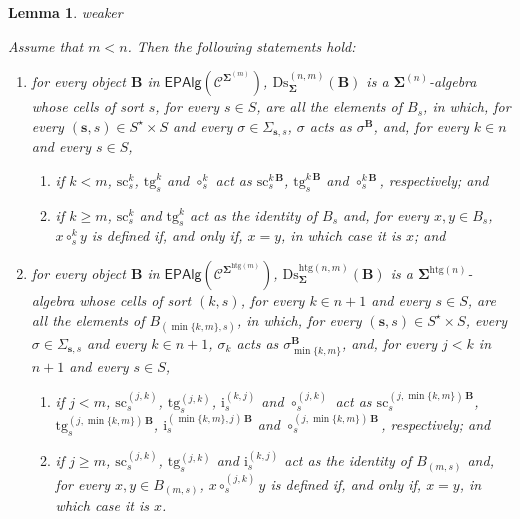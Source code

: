\documentclass[a4paper, reqno]{amsbook}
\makeatletter
\newcommand{\sig}[1]{\mathbf{#1}}             %
\newcommand{\spec}[1]{\boldsymbol{\mathcal{#1}}} %
\newcommand{\htg}{\mathrm{htg}}                %
\newcommand{\src}{\mathrm{sc}}
\newcommand{\tgt}{\mathrm{tg}}
\newcommand{\Ds}{\mathrm{Ds}}
\theoremstyle{plain}
\newtheorem{lemma}[theorem]{Lemma}
\theoremstyle{definition}
\newcommand*{\CA@leanpending}{}
\newcommand*{\CA@leanrelation}{}
\newcommand*{\lean}[2]{%
  \ifcsname\string\color@lean@#1\endcsname\else
    \PackageError{main}{Unknown relation `#1' in \string\lean}{Use equivalent, weaker or stronger.}%
  \fi
  \gdef\CA@leanrelation{#1}%
  \gdef\CA@leanpending{#2}}
\makeatother
\begin{document}
\begin{lemma}\label{LDsDescription}\lean{weaker}{Dimensions.homogeneousDiscretizationRealization,Dimensions.heterogeneousDimensionRealization}
Assume that $m<n$.
Then the following statements hold:
\begin{enumerate}
\item for every object $\mathbf{B}$ in $\mathsf{EPAlg}(\spec{C}^{\sig{\Sigma}^{(m)}})$, $\Ds^{(n,m)}_{\sig{\Sigma}}(\mathbf{B})$ is a $\sig{\Sigma}^{(n)}$-algebra whose cells of sort $s$, for every $s\in S$, are all the elements of $B_{s}$, in which, for every $(\mathbf{s},s)\in S^{\star}\times S$ and every $\sigma\in\Sigma_{\mathbf{s},s}$, $\sigma$ acts as $\sigma^{\mathbf{B}}$, and, for every $k\in n$ and every $s\in S$,
\begin{enumerate}
\item if $k<m$, $\src^{k}_{s}$, $\tgt^{k}_{s}$ and $\circ^{k}_{s}$ act as $\src^{k\,\mathbf{B}}_{s}$, $\tgt^{k\,\mathbf{B}}_{s}$ and $\circ^{k\,\mathbf{B}}_{s}$, respectively; and
\item if $k\geq m$, $\src^{k}_{s}$ and $\tgt^{k}_{s}$ act as the identity of $B_{s}$ and, for every $x,y\in B_{s}$, $x\circ^{k}_{s}y$ is defined if, and only if, $x=y$, in which case it is $x$; and
\end{enumerate}
\item for every object $\mathbf{B}$ in $\mathsf{EPAlg}(\spec{C}^{\sig{\Sigma}^{\htg(m)}})$, $\Ds^{\htg(n,m)}_{\sig{\Sigma}}(\mathbf{B})$ is a $\sig{\Sigma}^{\htg(n)}$-algebra whose cells of sort $(k,s)$, for every $k\in n+1$ and every $s\in S$, are all the elements of $B_{(\min\{k,m\},s)}$, in which, for every $(\mathbf{s},s)\in S^{\star}\times S$, every $\sigma\in\Sigma_{\mathbf{s},s}$ and every $k\in n+1$, $\sigma_{k}$ acts as $\sigma^{\mathbf{B}}_{\min\{k,m\}}$, and, for every $j<k$ in $n+1$ and every $s\in S$,
\begin{enumerate}
\item if $j<m$, $\src^{(j,k)}_{s}$, $\tgt^{(j,k)}_{s}$, $\mathrm{i}^{(k,j)}_{s}$ and $\circ^{(j,k)}_{s}$ act as $\src^{(j,\min\{k,m\})\,\mathbf{B}}_{s}$, $\tgt^{(j,\min\{k,m\})\,\mathbf{B}}_{s}$, $\mathrm{i}^{(\min\{k,m\},j)\,\mathbf{B}}_{s}$ and $\circ^{(j,\min\{k,m\})\,\mathbf{B}}_{s}$, respectively; and
\item if $j\geq m$, $\src^{(j,k)}_{s}$, $\tgt^{(j,k)}_{s}$ and $\mathrm{i}^{(k,j)}_{s}$ act as the identity of $B_{(m,s)}$ and, for every $x,y\in B_{(m,s)}$, $x\circ^{(j,k)}_{s}y$ is defined if, and only if, $x=y$, in which case it is $x$.
\end{enumerate}
\end{enumerate}
\end{lemma}
\end{document}
